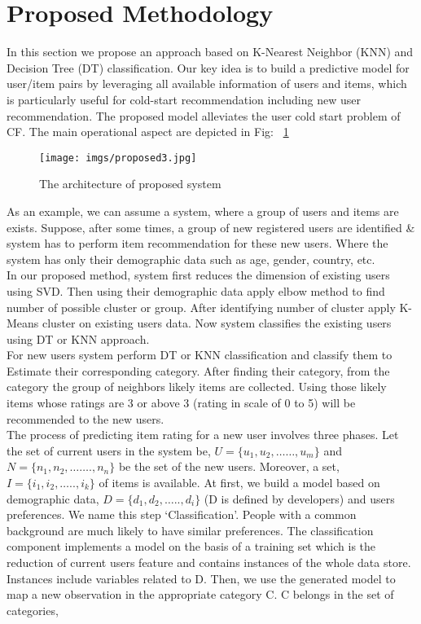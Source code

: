 \documentclass[document.tex]{subfiles}
\begin{document}
	\section{Proposed Methodology}
	In this section we propose an approach based on K-Nearest Neighbor (KNN) and Decision Tree (DT) classification. Our key idea is to build a predictive model for user/item pairs by leveraging all available information of users and items, which is particularly useful for cold-start recommendation including new user recommendation. The proposed model alleviates the user cold start problem of CF. The main operational aspect are depicted in Fig: ~\ref{proposal}
	\begin{figure}[H]
		\centering
		\texttt{[image: imgs/proposed3.jpg]}
		\caption[The architecture of proposed system]
		{The architecture of proposed system}
		\label{proposal}
	\end{figure}
	As an example, we can assume a system, where a group of users and items are exists. Suppose, after some times, a group of new registered users are identified \& system has to perform item recommendation for these new users. Where the system has only their demographic data such as age, gender, country, etc.\\
	In our proposed method, system first reduces the dimension of existing users using SVD. Then using their demographic data apply elbow method to find number of possible cluster or group. After identifying number of cluster apply K-Means cluster on existing users data. Now system classifies the existing users using DT or KNN approach.\\
	For new users system perform DT or KNN classification and classify them to Estimate their corresponding category. After finding their category, from the category the group of neighbors likely items are collected. Using those likely items whose ratings are 3 or above 3 (rating in scale of 0 to 5) will be recommended to the new users.\\
	The process of predicting item rating for a new user involves three phases. Let the set of current users in the system be,	$U = \{ u_1,u_2,……,u_m \}$ 
	and $N = \{ n_1,n_2,……., n_n \}$                        	               
	be the set of the new users. Moreover, a set,
	$I = \{ i_1,i_2,…..,i_k \}  $                                                   
	of items is available.
	At first, we build a model based on demographic data,
	$D = \{ d_1,d_2,…..,d_i \}$ (D is defined by developers) and users preferences. We name this step ‘Classification’. People with a common background are much likely to have similar preferences. The classification component implements a model on the basis of a training set which is the reduction of current users feature and contains instances of the whole data store. Instances include variables related to D. Then, we use the generated model to map a new observation in the appropriate category C. C belongs in the set of categories,
\end{document}

